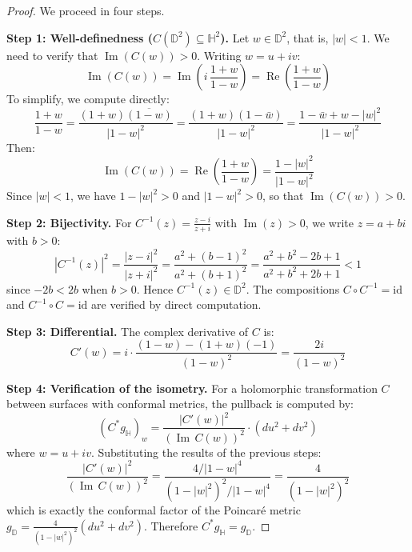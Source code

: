 \begin{proof}
We proceed in four steps.

\textbf{Step 1: Well-definedness ($C(\mathbb{D}^2) \subseteq \mathbb{H}^2$).}
Let $w \in \mathbb{D}^2$, that is, $|w| < 1$. We need to verify that $\operatorname{Im}(C(w)) > 0$. Writing $w = u + iv$:
\begin{equation}\label{eq:parte_imaginaria_cayley}
\operatorname{Im}(C(w)) = \operatorname{Im}\!\left(i\,\frac{1+w}{1-w}\right) = \operatorname{Re}\!\left(\frac{1+w}{1-w}\right)
\end{equation}
To simplify, we compute directly:
\[
\frac{1+w}{1-w} = \frac{(1+w)\overline{(1-w)}}{|1-w|^2} = \frac{(1+w)(1-\bar{w})}{|1-w|^2} = \frac{1 - \bar{w} + w - |w|^2}{|1-w|^2}
\]
Then:
\[
\operatorname{Im}(C(w)) = \operatorname{Re}\!\left(\frac{1+w}{1-w}\right) = \frac{1 - |w|^2}{|1-w|^2}
\]
Since $|w| < 1$, we have $1 - |w|^2 > 0$ and $|1-w|^2 > 0$, so that $\operatorname{Im}(C(w)) > 0$.

\textbf{Step 2: Bijectivity.}
For $C^{-1}(z) = \frac{z-i}{z+i}$ with $\operatorname{Im}(z) > 0$, we write $z = a + bi$ with $b > 0$:
\[
|C^{-1}(z)|^2 = \frac{|z-i|^2}{|z+i|^2} = \frac{a^2 + (b-1)^2}{a^2 + (b+1)^2} = \frac{a^2 + b^2 - 2b + 1}{a^2 + b^2 + 2b + 1} < 1
\]
since $-2b < 2b$ when $b > 0$. Hence $C^{-1}(z) \in \mathbb{D}^2$. The compositions $C \circ C^{-1} = \mathrm{id}$ and $C^{-1} \circ C = \mathrm{id}$ are verified by direct computation.

\textbf{Step 3: Differential.}
The complex derivative of $C$ is:
\begin{equation}\label{eq:derivada_cayley}
C'(w) = i \cdot \frac{(1-w) - (1+w)(-1)}{(1-w)^2} = \frac{2i}{(1-w)^2}
\end{equation}

\textbf{Step 4: Verification of the isometry.}
For a holomorphic transformation $C$ between surfaces with conformal metrics, the pullback is computed by:
\[
(C^* g_{\mathbb{H}})_w = \frac{|C'(w)|^2}{(\operatorname{Im}\, C(w))^2} \cdot (du^2 + dv^2)
\]
where $w = u + iv$. Substituting the results of the previous steps:
\[
\frac{|C'(w)|^2}{(\operatorname{Im}\, C(w))^2} = \frac{4/|1-w|^4}{(1-|w|^2)^2/|1-w|^4} = \frac{4}{(1-|w|^2)^2}
\]
which is exactly the conformal factor of the Poincaré metric $g_{\mathbb{D}} = \frac{4}{(1-|w|^2)^2}(du^2 + dv^2)$. Therefore $C^* g_{\mathbb{H}} = g_{\mathbb{D}}$.
\end{proof}

